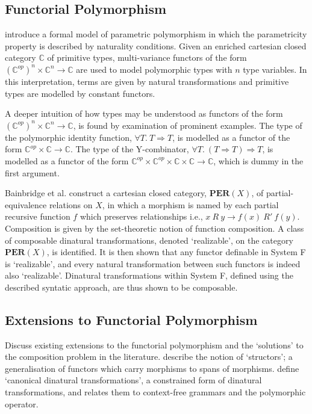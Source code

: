 \documentclass[../../Dissertation.tex]{subfiles}
\begin{document}
\subsection{Functorial Polymorphism}\label{sec:functorial}
 introduce a formal model of parametric polymorphism in which the parametricity property is described by naturality conditions. Given an enriched cartesian closed category $\mathbb{C}$ of primitive types, multi-variance functors of the form $(\mathbb{C}^{op})^n \times \mathbb{C}^n \rightarrow \mathbb{C}$ are used to model polymorphic types with $n$ type variables. In this interpretation, terms are given by natural transformations and primitive types are modelled by constant functors.
\par
A deeper intuition of how types may be understood as functors of the form $(\mathbb{C}^{op})^n \times \mathbb{C}^n \rightarrow \mathbb{C}$, is found by examination of prominent examples. The type of the polymorphic identity function, $\forall T.\ T \Rightarrow T$, is modelled as a functor of the form $\mathbb{C}^{op} \times \mathbb{C} \rightarrow \mathbb{C}$. The type of the Y-combinator, $\forall T.\ (T \Rightarrow T) \Rightarrow T$, is modelled as a functor of the form $\mathbb{C}^{op} \times \mathbb{C}^{op} \times \mathbb{C} \times \mathbb{C} \rightarrow \mathbb{C}$, which is dummy in the first argument.
\par
Bainbridge et al. construct a cartesian closed category, $\mathbf{PER}(X)$, of partial-equivalence relations on $X$, in which a morphism is named by each partial recursive function $f$ which preserves relationships i.e., $x\ R\ y \rightarrow f(x)\ R'\ f(y)$. Composition is given by the set-theoretic notion of function composition. A class of composable dinatural transformations, denoted `realizable', on the category $\mathbf{PER}(X)$, is identified. It is then shown that any functor definable in System F is `realizable', and every natural transformation between such functors is indeed also `realizable'. Dinatural transformations within System F, defined using the described syntatic approach, are thus shown to be composable.

\subsection{Extensions to Functorial Polymorphism}
Discuss existing extensions to the functorial polymorphism and the `solutions' to the composition problem in the literature.
\newline\newline
{} describe the notion of `structors'; a generalisation of functors which carry morphisms to spans of morphisms.
\newline\newline
{} define `canonical dinatural transformations', a constrained form of dinatural transformations, and relates them to context-free grammars and the polymorphic operator.
\end{document}
